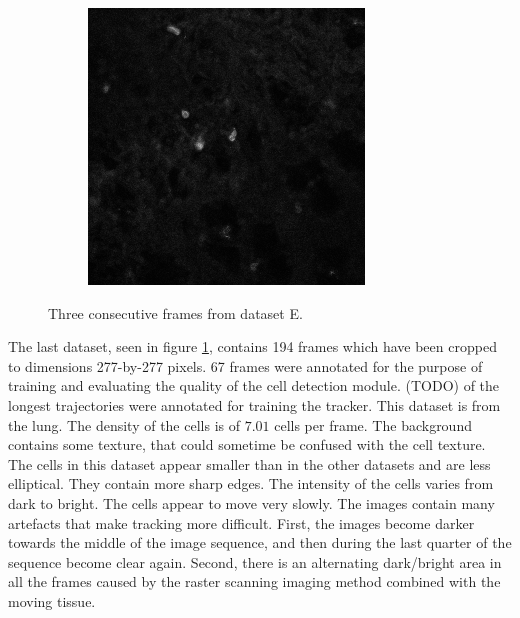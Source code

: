 \begin{figure}[h]
\begin{subfigure}{.32\textwidth}
		\end{subfigure}
		\hfill
		\begin{subfigure}{.32\textwidth}
		\includegraphics[width=\textwidth]{images/seriesm170_13cropped018}
		\end{subfigure}
		\caption{Three consecutive frames from dataset E.}
		\label{fig:data_datasetE}
	\end{figure}
        
    The last dataset, seen in figure \cref{fig:data_datasetE}, contains 194 frames which have been cropped to dimensions 277-by-277 pixels. 67 frames were annotated for the purpose of training and evaluating the quality of the cell detection module. (TODO) of the longest trajectories were annotated for training the tracker. This dataset is from the lung. The density of the cells is of $7.01$ cells per frame. The background contains some texture, that could sometime be confused with the cell texture. The cells in this dataset appear smaller than in the other datasets and are less elliptical. They contain more sharp edges. The intensity of the cells varies from dark to bright. The cells appear to move very slowly. The images contain many artefacts that make tracking more difficult. First, the images become darker towards the middle of the image sequence, and then during the last quarter of the sequence become clear again. Second, there is an alternating dark/bright area in all the frames caused by the raster scanning imaging method combined with the moving tissue.
    	
